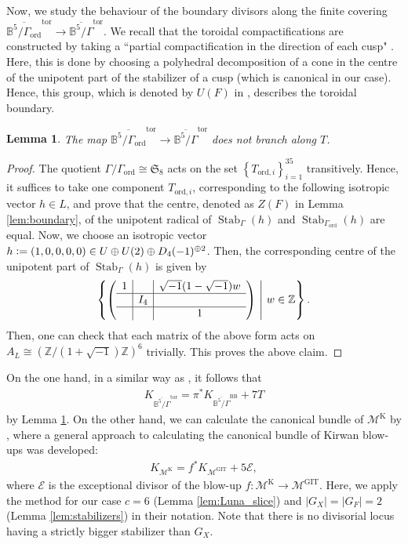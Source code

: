 \documentclass[12pt, pdftex]{amsart}
\theoremstyle{plain}
\newtheorem{lem}[thm]{Lemma}
\theoremstyle{definition}
\numberwithin{equation}{section}
\def\Z{{\mathbb Z}}
\def\B{{\mathbb B}}
\def\SS{{\mathfrak S}}
\def\Stab{\mathop{\mathrm{Stab}}\nolimits}
\def\ord{\mathrm{ord}}
\def\GIT{\mathrm{GIT}}
\def\K{\mathrm{K}}
\def\tor{\mathrm{tor}}
\def\BB{\mathrm{BB}}
\def\E{\mathscr{E}}
\def\M{\mathcal{M}}
\newcommand{\defeq}{\vcentcolon=}
\begin{document}
Now, we study the behaviour of the boundary divisors along the finite covering $\overline{\B^5/\Gamma_{\ord}}^{\tor}\to\overline{\B^5/\Gamma}^{\tor}$.
We recall that the toroidal compactifications are constructed by taking a  ``partial compactification in the direction of each cusp" \cite[Section III. 5]{AMRT10}.
Here, this is done by choosing a polyhedral decomposition of a cone in the centre of the unipotent part of the stabilizer of a cusp (which is canonical in our case).
Hence, this group, which is denoted by $U(F)$ in \cite{AMRT10}, describes the toroidal boundary.
\begin{lem}
\label{lem:boundary_branch}
    The map  $\overline{\B^5/\Gamma_{\ord}}^{\tor}\to\overline{\B^5/\Gamma}^{\tor}$ does not branch along $T$.
\end{lem}
\begin{proof}
The quotient $\Gamma/\Gamma_{\ord}\cong\SS_8$ acts on the set $\left\{T_{\ord,i}\right\}_{i=1}^{35}$ transitively.
Hence, it suffices to take one component $T_{\ord,i}$, corresponding to the following isotropic vector $h\in L$, and prove that the centre, denoted as $Z(F)$ in Lemma \ref{lem:boundary}, of the unipotent radical of $\Stab_{\Gamma}(h)$ and $\Stab_{\Gamma_{\ord}}(h)$ are equal.
Now, we choose an isotropic vector $h\defeq(1,0,0,0,0)\in U\oplus U(2)\oplus D_4(-1)^{\oplus 2}$.
Then, the corresponding centre of the unipotent part of $\Stab_{\Gamma}(h)$ is given by
\[\left\{\left(
\begin{array}{c|c|c}
1 &   &  \sqrt{-1}(1-\sqrt{-1})w\\\hline
 & I_{4}  &  \\\hline
 &  & 1
\end{array}
\right)\ \middle|\ w\in\Z\right\}.
\]
Then, one can check that each matrix of the above form acts on $A_L\cong\left(\Z/(1+\sqrt{-1})\Z\right)^6$ trivially.
This proves the above claim.
\end{proof}
On the one hand, in a similar way as \cite[Proposition 5.8]{CMGHL22}, it follows that
    \begin{align}
\label{nonord_tor_K}
K_{\overline{\B^5/\Gamma}^{\tor}}=\pi^{*}K_{\overline{\B^5/\Gamma}^{\BB}}+7T
\end{align}
by Lemma \ref{lem:boundary_branch}.
On the other hand, we can calculate the canonical bundle of $\M^{\K}$ by \cite[Lemma 6.4]{CMGHL22}, where a general approach to calculating the canonical bundle of Kirwan blow-ups was developed:
\begin{align}
\label{nonord_Kirwan_K}
    K_{\M^{\K}}=f^{*}K_{\M^{\GIT}}+5\E,
\end{align}
where $\E$ is the exceptional divisor of the blow-up $f:\M^{\K}\to\M^{\GIT}$.
Here, we apply the method \cite[Lemma 6.4]{CMGHL22} for our case $c=6$ (Lemma \ref{lem:Luna_slice}) and $|G_X|=|G_F|=2$ (Lemma \ref{lem:stabilizers}) in their notation.
Note that there is no divisorial locus having a strictly bigger stabilizer than $G_X$.
\end{document}
